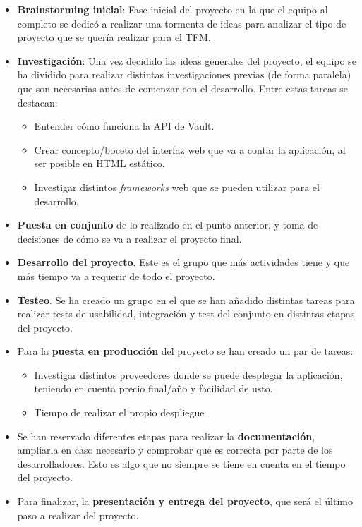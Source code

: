 \documentclass{\ClassPath/viu-tfm-template}
\begin{document}
\begin{itemize}
    \item \textbf{Brainstorming inicial}: Fase inicial del proyecto en la que el equipo al completo se dedicó a realizar una tormenta de ideas para analizar el tipo de proyecto que se quería realizar para el TFM.

    \item \textbf{Investigación}: Una vez decidido las ideas generales del proyecto, el equipo se ha dividido para realizar distintas investigaciones previas (de forma paralela) que son necesarias antes de comenzar con el desarrollo. Entre estas tareas se destacan:
    \begin{itemize}
        \item Entender cómo funciona la API de Vault.
        \item Crear concepto/boceto del interfaz web que va a contar la aplicación, al ser posible en HTML estático.
        \item Investigar distintos \textit{frameworks} web que se pueden utilizar para el desarrollo.
    \end{itemize}

    \item \textbf{Puesta en conjunto} de lo realizado en el punto anterior, y toma de decisiones de cómo se va a realizar el proyecto final.

    \item \textbf{Desarrollo del proyecto}. Este es el grupo que más actividades tiene y que más tiempo va a requerir de todo el proyecto.

    \item \textbf{Testeo}. Se ha creado un grupo en el que se han añadido distintas tareas para realizar tests de usabilidad, integración y test del conjunto en distintas etapas del proyecto.

    \item Para la \textbf{puesta en producción} del proyecto se han creado un par de tareas:
    \begin{itemize}
        \item Investigar distintos proveedores donde se puede desplegar la aplicación, teniendo en cuenta precio final/año y facilidad de usto.
        \item Tiempo de realizar el propio despliegue
    \end{itemize}

    \item Se han reservado diferentes etapas para realizar la \textbf{documentación}, ampliarla en caso necesario y comprobar que es correcta por parte de los desarrolladores. Esto es algo que no siempre se tiene en cuenta en el tiempo del proyecto.

    \item Para finalizar, la \textbf{presentación y entrega del proyecto}, que será el último paso a realizar del proyecto.
\end{itemize}
\end{document}
